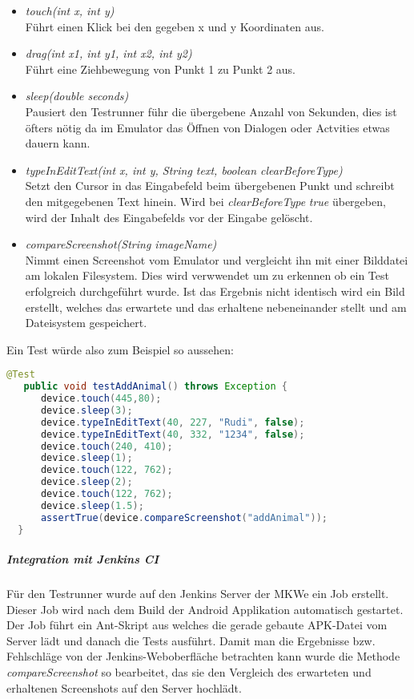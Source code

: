 \begin{itemize}
\item{\textit{touch(int x, int y)}} \\
Führt einen Klick bei den gegeben x und y Koordinaten aus.
\item{\textit{drag(int x1, int y1, int x2, int y2)}} \\
Führt eine Ziehbewegung von Punkt 1 zu Punkt 2 aus.
\item{\textit{sleep(double seconds)}} \\
Pausiert den Testrunner führ die übergebene Anzahl von Sekunden, dies ist öfters nötig da im Emulator das Öffnen von Dialogen oder Actvities etwas dauern kann.
\item{\textit{typeInEditText(int x, int y, String text, boolean clearBeforeType)}} \\
Setzt den Cursor in das Eingabefeld beim übergebenen Punkt und schreibt den mitgegebenen Text hinein. Wird bei \textit{clearBeforeType} \textit{true} übergeben, wird der Inhalt des Eingabefelds vor der Eingabe gelöscht.
\item{\textit{compareScreenshot(String imageName)}} \\
Nimmt einen Screenshot vom Emulator und vergleicht ihn mit einer Bilddatei am lokalen Filesystem. Dies wird verwwendet um zu erkennen ob ein Test erfolgreich durchgeführt wurde. Ist das Ergebnis nicht identisch wird ein Bild erstellt, welches das erwartete und das erhaltene nebeneinander stellt und am Dateisystem gespeichert. 
\end{itemize}
Ein Test würde also zum Beispiel so aussehen:
\begin{lstlisting}[language=java, captionpos=b, caption={Test Beispiel}]
   @Test
   public void testAddAnimal() throws Exception {
      device.touch(445,80);
      device.sleep(3);
      device.typeInEditText(40, 227, "Rudi", false);
      device.typeInEditText(40, 332, "1234", false);
      device.touch(240, 410);
      device.sleep(1);
      device.touch(122, 762);
      device.sleep(2);
      device.touch(122, 762);
      device.sleep(1.5);
      assertTrue(device.compareScreenshot("addAnimal"));
  }
\end{lstlisting}
\subparagraph{Integration mit Jenkins CI}
Für den Testrunner wurde auf den Jenkins Server der MKWe ein Job erstellt. Dieser Job wird nach dem Build der Android Applikation automatisch gestartet. Der Job führt ein Ant-Skript aus welches die gerade gebaute APK-Datei vom Server lädt und danach die Tests ausführt. Damit man die Ergebnisse bzw. Fehlschläge von der Jenkins-Weboberfläche betrachten kann wurde die Methode \textit{compareScreenshot} so bearbeitet, das sie den Vergleich des erwarteten und erhaltenen Screenshots auf den Server hochlädt. 